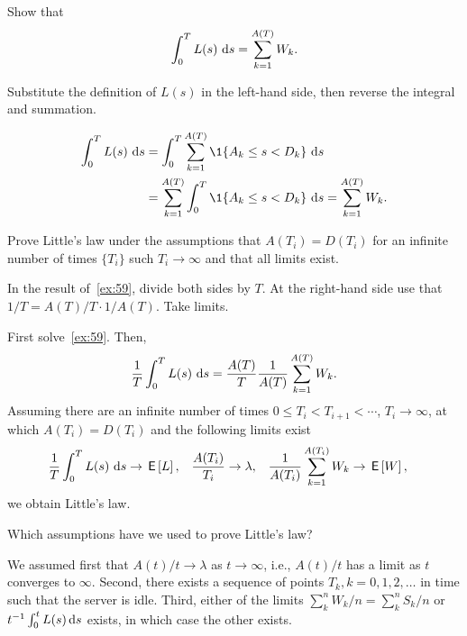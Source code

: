 \begin{extra}
 Show that 
\begin{equation*}
 \int_0^T L(s)\, \,\text{d}s = \sum_{k=1}^{A(T)} W_k.
\end{equation*}
\begin{hint}
 Substitute the definition of $L(s)$ in the left-hand side, then reverse the integral and summation.
\end{hint}
\begin{solution}
\begin{equation*}
 \begin{split}
 \int_0^T L(s)\, \d s & = \int_0^T \sum_{k=1}^{A(T)} \1{A_k \leq s < D_k}\, \d s \\
& = \sum_{k=1}^{A(T)}\int_0^T \1{A_k \leq s < D_k}\, \d s = \sum_{k=1}^{A(T)} W_k.
 \end{split}
\end{equation*}
\end{solution}
\end{extra}

\begin{exercise}
 Prove Little's law under the assumptions that $A(T_i) = D(T_i)$ for an infinite number of times $\{T_i\}$ such $T_i\to\infty$ and that all limits exist. 
\begin{hint}
In  the result of~\cref{ex:59},  divide both sides by $T$. At the right-hand side use that $1/T = A(T)/T \cdot 1/A(T)$. Take limits.
\end{hint}
\begin{solution}
  First solve~\cref{ex:59}. Then,
\begin{equation*}
 \frac 1 T \int_0^T L(s)\, \,\text{d}s = \frac{A(T)} T \frac{1}{A(T)} \sum_{k=1}^{A(T)} W_k.
\end{equation*}
Assuming there are an infinite number of times
$0\leq T_i<T_{i+1}<\cdots$, $T_i\to\infty$, at which $A(T_i) = D(T_i)$
and the following limits exist
\begin{align*}
\frac 1 T \int_0^T L(s)\, \,\text{d}s &\to \,\mathsf{E}\left[L\right],&
\frac{A(T_i)}{T_i} &\to \lambda, &
\frac{1}{A(T_i)} \sum_{k=1}^{A(T_i)} W_k &\to \,\mathsf{E}\left[W\right],
\end{align*}
we obtain Little's law.

\end{solution}
\end{exercise}


\begin{extra}
 Which assumptions have we used to prove Little's law?
\begin{solution}
 We assumed first that $A(t)/t \to \lambda$ as $t\to \infty$, i.e., $A(t)/t$ has a limit as $t$ converges to $\infty$.
 Second, there exists a sequence of points $T_k, k=0,1,2,\ldots$ in time such that the server is idle.
 Third, either of the limits $\sum_k^n W_k/n = \sum_k^n S_k /n $ or $t^{-1}\int_0^t L(s) \,\text{d}s$ exists, in which case the other exists.
\end{solution}
\end{extra}

